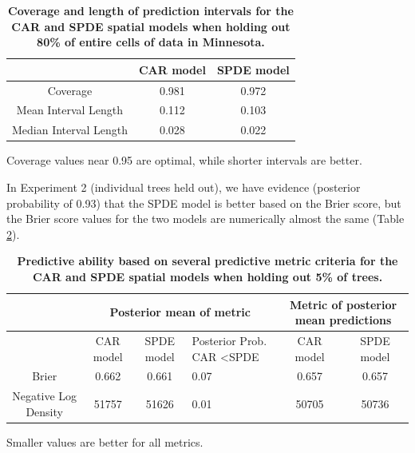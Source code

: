 \documentclass[10pt,letterpaper]{article}
\begin{document}
\begin{table}
\begin{adjustwidth}{-2.25in}{0in}
\caption{{\bf Coverage and length of prediction intervals for the CAR and SPDE spatial
models when holding out 80\% of entire cells of data in Minnesota.}}


\begin{tabular}{|c|c|c|}
\hline 
 &
{\small{}CAR model} &
{\small{}SPDE model}\tabularnewline
\hline 
{\small{}Coverage} &
{\small{}0.981} &
{\small{}0.972}\tabularnewline
\hline 
{\small{}Mean Interval Length} &
{\small{}0.112} &
{\small{}0.103}\tabularnewline
\hline 
{\small{}Median Interval Length} &
{\small{}0.028} &
{\small{}0.022}\tabularnewline
\hline 
\end{tabular}
\begin{flushleft}
Coverage values near 0.95 are optimal, while shorter intervals are
better.
\end{flushleft}

\label{tab:coverage_cell_20percent}
\end{adjustwidth}
\end{table}

In Experiment 2 (individual trees held out), we have evidence (posterior
probability of 0.93) that the SPDE model is better based on the Brier
score, but the Brier score values for the two models are numerically
almost the same (Table \ref{tab:score_tree}).


\begin{table}
\begin{adjustwidth}{-2.25in}{0in}
\caption{{\bf Predictive ability based on several predictive metric criteria for
the CAR and SPDE spatial models when holding out 5\% of trees.}}


\begin{tabular}{|c|c|c|>{\centering}p{3cm}|c|c|}
\hline 
 &
\multicolumn{3}{c|}{{\small{}Posterior mean of metric}} &
\multicolumn{2}{c|}{{\small{}Metric of posterior mean predictions}}\tabularnewline
\hline 
\hline 
 &
{\small{}CAR model} &
{\small{}SPDE model} &
{\small{}Posterior Prob. CAR \textless  SPDE} &
{\small{}CAR model} &
{\small{}SPDE model}\tabularnewline
\hline 
{\small{}Brier} &
{\small{}0.662} &
{\small{}0.661} &
{\small{}0.07} &
{\small{}0.657} &
{\small{}0.657}\tabularnewline
\hline 
{\small{}Negative Log Density} &
{\small{}51757} &
{\small{}51626} &
{\small{}0.01} &
{\small{}50705} &
{\small{}50736}\tabularnewline
\hline 
\end{tabular}
\begin{flushleft}
 Smaller values are better for all metrics.
\end{flushleft}
\label{tab:score_tree}
\end{adjustwidth}
\end{table}
\end{document}
